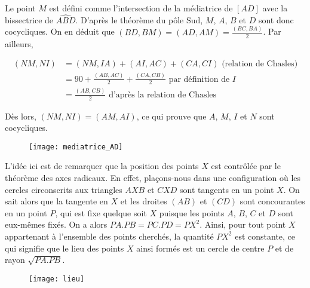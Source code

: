 \begin{sol}
\begin{center}
\end{center}
\end{sol}


\begin{sol}
Le point $M$ est défini comme l'intersection de la médiatrice de $[AD]$ avec la bissectrice de $\widehat{ABD}$. D'après le théorème du pôle Sud, $M$, $A$, $B$ et $D$ sont donc cocycliques. On en déduit que $(BD,BM)=(AD,AM)=\frac{(BC,BA)}{2}$. Par ailleurs,

\begin{align*}
(NM,NI) &=(NM,IA)+(AI,AC)+(CA,CI) \text{\ \ (relation de Chasles)}\\
&= 90+\frac{(AB,AC)}{2}+\frac{(CA,CB)}{2} \text{\ \ par définition de $I$}\\
&= \frac{(AB,CB)}{2} \text{\ \ d'après la relation de Chasles}
\end{align*}

Dès lors, $(NM,NI)=(AM,AI)$, ce qui prouve que $A$, $M$, $I$ et $N$ sont cocycliques.

\begin{figure}[!h]
\centerline{\texttt{[image: mediatrice\_AD]}}
\end{figure}
\end{sol}


\begin{sol}
L'idée ici est de remarquer que la position des points $X$ est contrôlée par le théorème des axes radicaux. En effet, plaçons-nous dans une configuration où les cercles circonscrits aux triangles $AXB$ et $CXD$ sont tangents en un point $X$. On sait alors que la tangente en $X$ et les droites $(AB)$ et $(CD)$ sont concourantes en un point $P$, qui est fixe quelque soit $X$ puisque les points $A$, $B$, $C$ et $D$ sont eux-mêmes fixés. On a alors $PA.PB = PC.PD = PX^2$. Ainsi, pour tout point $X$ appartenant à l'ensemble des points cherchés, la quantité $PX^2$ est constante, ce qui signifie que le lieu des points $X$ ainsi formés est un cercle de centre $P$ et de rayon $\sqrt{PA.PB}$.

\begin{figure}[!h]
\centerline{\texttt{[image: lieu]}}
\end{figure}
\end{sol}